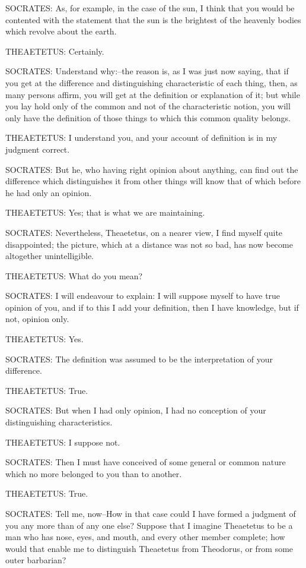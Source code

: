 SOCRATES: As, for example, in the case of the sun, I think that you
would be contented with the statement that the sun is the brightest of
the heavenly bodies which revolve about the earth.

THEAETETUS: Certainly.

SOCRATES: Understand why:--the reason is, as I was just now saying, that
if you get at the difference and distinguishing characteristic of each
thing, then, as many persons affirm, you will get at the definition or
explanation of it; but while you lay hold only of the common and not of
the characteristic notion, you will only have the definition of those
things to which this common quality belongs.

THEAETETUS: I understand you, and your account of definition is in my
judgment correct.

SOCRATES: But he, who having right opinion about anything, can find out
the difference which distinguishes it from other things will know that
of which before he had only an opinion.

THEAETETUS: Yes; that is what we are maintaining.

SOCRATES: Nevertheless, Theaetetus, on a nearer view, I find myself
quite disappointed; the picture, which at a distance was not so bad, has
now become altogether unintelligible.

THEAETETUS: What do you mean?

SOCRATES: I will endeavour to explain: I will suppose myself to have
true opinion of you, and if to this I add your definition, then I have
knowledge, but if not, opinion only.

THEAETETUS: Yes.

SOCRATES: The definition was assumed to be the interpretation of your
difference.

THEAETETUS: True.

SOCRATES: But when I had only opinion, I had no conception of your
distinguishing characteristics.

THEAETETUS: I suppose not.

SOCRATES: Then I must have conceived of some general or common nature
which no more belonged to you than to another.

THEAETETUS: True.

SOCRATES: Tell me, now--How in that case could I have formed a judgment
of you any more than of any one else? Suppose that I imagine Theaetetus
to be a man who has nose, eyes, and mouth, and every other member
complete; how would that enable me to distinguish Theaetetus from
Theodorus, or from some outer barbarian?

